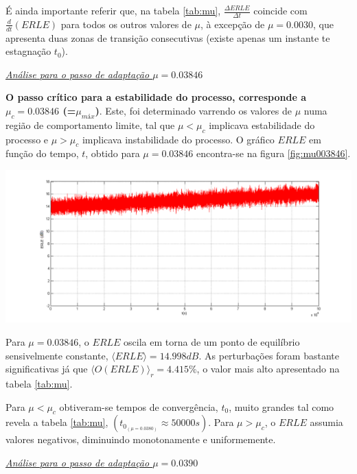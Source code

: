 \documentclass[a4paper,11pt]{report}
\begin{document}
\par É ainda importante referir que, na tabela \ref{tab:mu}, $\frac{\Delta ERLE}{\Delta t}$ coincide com $\frac{d}{dt}\left(ERLE\right)$ para todos os outros valores de $\mu$, à excepção de $\mu=0.0030$, que apresenta duas zonas de transição consecutivas (existe apenas um instante te estagnação $t_0$).\\
\par
\large\underline{{\textit{Análise para o passo de adaptação $\mu=0.03846$}}}\\
\par
\textbf{O passo crítico para a estabilidade do processo, corresponde a $\mu_c=0.03846$ (=$\mu_{máx}$)}. Este, foi determinado varrendo os valores de $\mu$ numa região de comportamento limite, tal que $\mu<\mu_c$ implicava estabilidade do processo e $\mu>\mu_c$ implicava instabilidade do processo. O gráfico $ERLE$ em função do tempo, $t$, obtido para $\mu=0.03846$ encontra-se na figura \ref{fig:mu003846}.

\begin{center}
     \includegraphics[angle=0,width=1\textwidth]{mu003846.png}
     \label{fig:mu003846}
     \end{center}
     
Para $\mu=0.03846$, o $ERLE$ oscila em torna de um ponto de equilíbrio sensivelmente constante, $\langle ERLE \rangle=14.998dB$. As perturbações foram bastante significativas  já que $\langle O(ERLE)\rangle_r=4.415\%$, o valor mais alto apresentado na tabela \ref{tab:mu}.\\
\par 
Para  $\mu<\mu_c$ obtiveram-se tempos de convergência, $t_0$, muito grandes tal como revela a tabela \ref{tab:mu}, $\left(t_{0_{(\mu=0.0380)}}\approx50000s\right)$.
Para $\mu>\mu_c$, o $ERLE$ assumia valores negativos, diminuindo monotonamente e uniformemente. \\
\par
\large\underline{{\textit{Análise para o passo de adaptação $\mu=0.0390$}}}\\
\par
\end{document}
